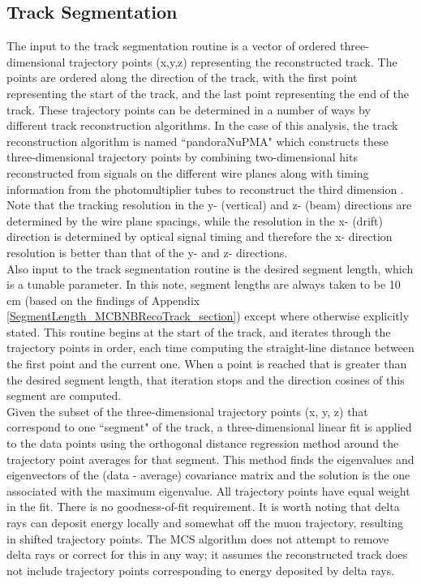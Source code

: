 \subsection{Track Segmentation}\label{track_segmentation_section}
The input to the track segmentation routine is a vector of ordered three-dimensional trajectory points (x,y,z) representing the reconstructed track. The points are ordered along the direction of the track, with the first point representing the start of the track, and the last point representing the end of the track. These trajectory points can be determined in a number of ways by different track reconstruction algorithms. In the case of this analysis, the track reconstruction algorithm is named ``pandoraNuPMA" which constructs these three-dimensional trajectory points by combining two-dimensional hits reconstructed from signals on the different wire planes along with timing information from the photomultiplier tubes to reconstruct the third dimension \cite{Marshall:2015rfa}. Note that the tracking resolution in the y- (vertical) and z- (beam) directions are determined by the wire plane spacings, while the resolution in the x- (drift) direction is determined by optical signal timing and therefore the x- direction resolution is better than that of the y- and z- directions.\\

Also input to the track segmentation routine is the desired segment length, which is a tunable parameter. In this note, segment lengths are always taken to be 10 cm (based on the findings of Appendix \ref{SegmentLength_MCBNBRecoTrack_section}) except where otherwise explicitly stated. This routine begins at the start of the track, and iterates through the trajectory points in order, each time computing the straight-line distance between the first point and the current one. When a point is reached that is greater than the desired segment length, that iteration stops and the direction cosines of this segment are computed.\\

Given the subset of the three-dimensional trajectory points (x, y, z) that correspond to one ``segment" of the track, a three-dimensional linear fit is applied to the data points using the orthogonal distance regression method around the trajectory point averages for that segment. This method finds the eigenvalues and eigenvectors of the (data - average) covariance matrix and the solution is the one associated with the maximum eigenvalue. All trajectory points have equal weight in the fit. There is no goodness-of-fit requirement. It is worth noting that delta rays can deposit energy locally and somewhat off the muon trajectory, resulting in shifted trajectory points. The MCS algorithm does not attempt to remove delta rays or correct for this in any way; it assumes the reconstructed track does not include trajectory points corresponding to energy deposited by delta rays. \\

